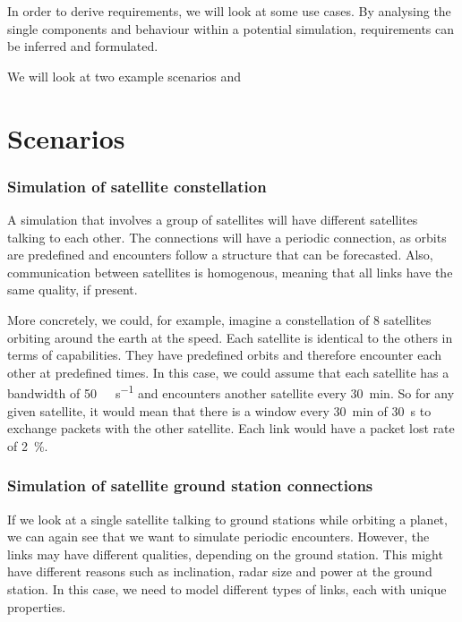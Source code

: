 In order to derive requirements, we will look at some use cases. By analysing the single components and behaviour within a potential simulation, requirements can be inferred and formulated.

We will look at two example scenarios and

\section{Scenarios}
\label{section:scenarios}

\subsubsection{Simulation of satellite constellation}

A simulation that involves a group of satellites will have different satellites talking to each other. The connections will have a periodic connection, as orbits are predefined and encounters follow a structure that can be forecasted. Also, communication between satellites is homogenous, meaning that all links have the same quality, if present.

More concretely, we could, for example, imagine a constellation of 8 satellites orbiting around the earth at the speed. Each satellite is identical to the others in terms of capabilities. They have predefined orbits and therefore encounter each other at predefined times. In this case, we could assume that each satellite has a bandwidth of \SI{50}{\kibi\byte\per\second} and encounters another satellite every \SI{30}{\minute}.
So for any given satellite, it would mean that there is a window every \SI{30}{\minute} of \SI{30}{\second} to exchange packets with the other satellite. Each link would have a packet lost rate of \SI{2}{\percent}.

\subsubsection{Simulation of satellite ground station connections}
\label{sim-sat-ground}

If we look at a single satellite talking to ground stations while orbiting a planet, we can again see that we want to simulate periodic encounters. However, the links may have different qualities, depending on the ground station. This might have different reasons such as inclination, radar size and power at the ground station. In this case, we need to model different types of links, each with unique properties.

